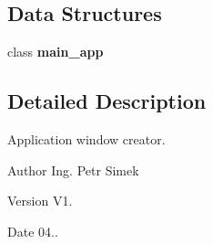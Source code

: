 \subsection*{Data Structures}
\begin{DoxyCompactItemize}
\item 
class \textbf{ main\+\_\+app}
\end{DoxyCompactItemize}


\subsection{Detailed Description}
Application window creator. 

\begin{DoxyAuthor}{Author}
Ing. Petr Simek 
\end{DoxyAuthor}
\begin{DoxyVersion}{Version}
V1. 
\end{DoxyVersion}
\begin{DoxyDate}{Date}
04.. 
\end{DoxyDate}
